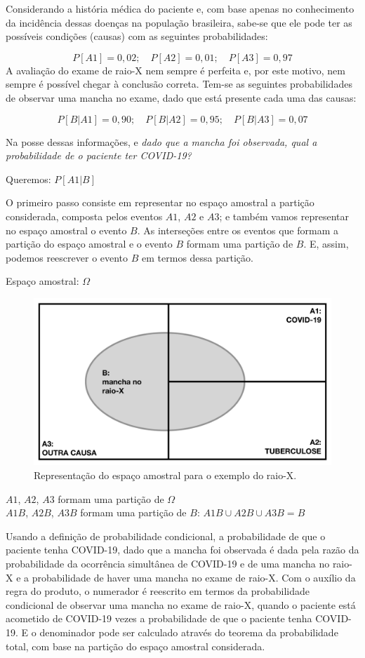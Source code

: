 \documentclass[
]{book}
\theoremstyle{definition}
\theoremstyle{definition}
\theoremstyle{definition}
\theoremstyle{remark}
\begin{document}
Considerando a história médica do paciente e, com base apenas no conhecimento da incidência dessas doenças na população brasileira, sabe-se que ele pode ter as possíveis condições (causas) com as seguintes probabilidades:

\[{P[A1] = 0,02;  \quad  P[A2] = 0,01;  \quad  P[A3] = 0,97}\]
A avaliação do exame de raio-X nem sempre é perfeita e, por este motivo, nem sempre é possível chegar à conclusão correta. Tem-se as seguintes probabilidades de observar uma mancha no exame, dado que está presente cada uma das causas:

\[{P[B|A1] = 0,90;  \quad  P[B|A2] = 0,95;  \quad  P[B|A3] = 0,07}\]

Na posse dessas informações, e \emph{dado que a mancha foi observada, qual a probabilidade de o paciente ter COVID-19?}

Queremos: \(P[A1|B]\)

O primeiro passo consiste em representar no espaço amostral a partição considerada, composta pelos eventos \(A1\), \(A2\) e \(A3\); e também vamos representar no espaço amostral o evento \(B\). As interseções entre os eventos que formam a partição do espaço amostral e o evento \(B\) formam uma partição de \(B\). E, assim, podemos reescrever o evento \(B\) em termos dessa partição.

Espaço amostral: \(\Omega\)

\begin{figure}
\includegraphics[width=0.7\linewidth]{img/raio-x-venn} \caption{Representação do espaço amostral para o exemplo do raio-X.}\label{fig:ch4-raio-x-venn}
\end{figure}

\(A1\), \(A2\), \(A3\) formam uma partição de \({\Omega}\)\\
\(A1B\), \(A2B\), \(A3B\) formam uma partição de \(B\): \(A1B \cup A2B \cup A3B = B\)

Usando a definição de probabilidade condicional, a probabilidade de que o paciente tenha COVID-19, dado que a mancha foi observada é dada pela razão da probabilidade da ocorrência simultânea de COVID-19 e de uma mancha no raio-X e a probabilidade de haver uma mancha no exame de raio-X. Com o auxílio da regra do produto, o numerador é reescrito em termos da probabilidade condicional de observar uma mancha no exame de raio-X, quando o paciente está acometido de COVID-19 vezes a probabilidade de que o paciente tenha COVID-19. E o denominador pode ser calculado através do teorema da probabilidade total, com base na partição do espaço amostral considerada.
\end{document}
